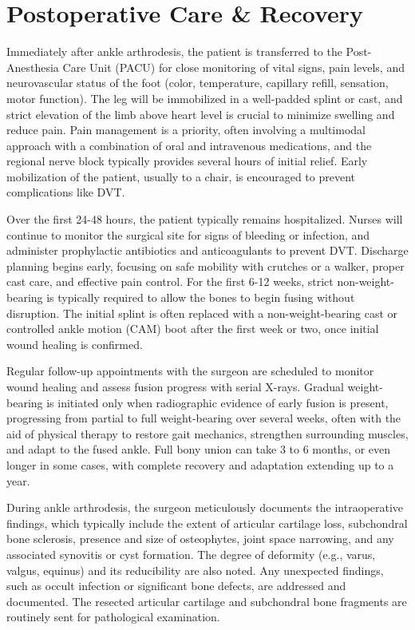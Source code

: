 \section*{Postoperative Care \& Recovery}
Immediately after ankle arthrodesis, the patient is transferred to the Post-Anesthesia Care Unit (PACU) for close monitoring of vital signs, pain levels, and neurovascular status of the foot (color, temperature, capillary refill, sensation, motor function). The leg will be immobilized in a well-padded splint or cast, and strict elevation of the limb above heart level is crucial to minimize swelling and reduce pain. Pain management is a priority, often involving a multimodal approach with a combination of oral and intravenous medications, and the regional nerve block typically provides several hours of initial relief. Early mobilization of the patient, usually to a chair, is encouraged to prevent complications like DVT.

Over the first 24-48 hours, the patient typically remains hospitalized. Nurses will continue to monitor the surgical site for signs of bleeding or infection, and administer prophylactic antibiotics and anticoagulants to prevent DVT. Discharge planning begins early, focusing on safe mobility with crutches or a walker, proper cast care, and effective pain control. For the first 6-12 weeks, strict non-weight-bearing is typically required to allow the bones to begin fusing without disruption. The initial splint is often replaced with a non-weight-bearing cast or controlled ankle motion (CAM) boot after the first week or two, once initial wound healing is confirmed. 

Regular follow-up appointments with the surgeon are scheduled to monitor wound healing and assess fusion progress with serial X-rays. Gradual weight-bearing is initiated only when radiographic evidence of early fusion is present, progressing from partial to full weight-bearing over several weeks, often with the aid of physical therapy to restore gait mechanics, strengthen surrounding muscles, and adapt to the fused ankle. Full bony union can take 3 to 6 months, or even longer in some cases, with complete recovery and adaptation extending up to a year.

During ankle arthrodesis, the surgeon meticulously documents the intraoperative findings, which typically include the extent of articular cartilage loss, subchondral bone sclerosis, presence and size of osteophytes, joint space narrowing, and any associated synovitis or cyst formation. The degree of deformity (e.g., varus, valgus, equinus) and its reducibility are also noted. Any unexpected findings, such as occult infection or significant bone defects, are addressed and documented. The resected articular cartilage and subchondral bone fragments are routinely sent for pathological examination.

